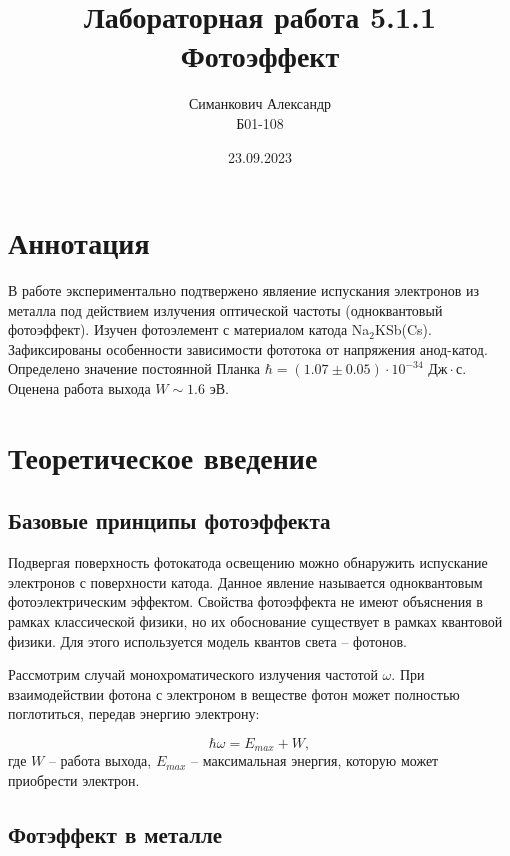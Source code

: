 \documentclass[12pt,a4paper]{article}
\title{Лабораторная работа 5.1.1 \\ Фотоэффект}
\author{Симанкович Александр\\ Б01-108}
\date{23.09.2023}
\begin{document}
	\maketitle
	
	\section*{Аннотация}
	
	В работе экспериментально подтвержено являение испускания электронов из металла под действием излучения оптической частоты (одноквантовый фотоэффект). Изучен фотоэлемент с материалом катода Na$_2$KSb(Cs). Зафиксированы особенности зависимости фототока от напряжения анод-катод. Определено значение постоянной Планка $\hbar = (1.07 \pm 0.05)\cdot 10^{-34} \text{ Дж}\cdot\text{с}$. Оценена работа выхода $W \sim 1.6 \text{ эВ}$.
	
	

	\section*{Теоретическое введение}
	
	\subsection*{Базовые принципы фотоэффекта}
	
	Подвергая поверхность фотокатода освещению можно обнаружить испускание электронов с поверхности катода. Данное явление называется одноквантовым фотоэлектрическим эффектом.
	Свойства фотоэффекта не имеют объяснения в рамках классической физики, но их обоснование существует в рамках квантовой физики. Для этого используется модель квантов света -- фотонов.
	
	Рассмотрим случай монохроматического излучения частотой $\omega$. При взаимодействии фотона с электроном в веществе фотон может полностью поглотиться, передав энергию электрону:
	
	\begin{equation}
		\hbar \omega = E_{max} + W,
		\label{eq:basic}
	\end{equation}
	где $W$ -- работа выхода, $E_{max}$ -- максимальная энергия, которую может приобрести электрон. 
	
	\subsection*{Фотэффект в металле}
\end{document}
